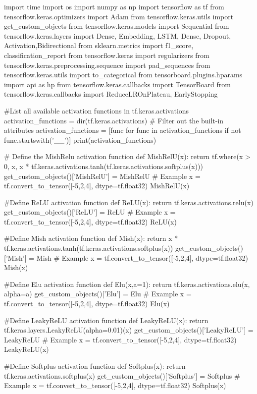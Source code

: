 import time
import os
import numpy as np
import tensorflow as tf
from tensorflow.keras.optimizers import Adam
from tensorflow.keras.utils import get_custom_objects
from tensorflow.keras.models import Sequential
from tensorflow.keras.layers import Dense, Embedding, LSTM, Dense, Dropout, Activation,Bidirectional 
from sklearn.metrics import f1_score, classification_report
from tensorflow.keras import regularizers
from tensorflow.keras.preprocessing.sequence import pad_sequences
from tensorflow.keras.utils import to_categorical
from tensorboard.plugins.hparams import api as hp
from tensorflow.keras.callbacks import TensorBoard
from tensorflow.keras.callbacks import ReduceLROnPlateau, EarlyStopping

#List all available activation functions in tf.keras.activations
activation_functions = dir(tf.keras.activations)
# Filter out the built-in attributes
activation_functions = [func for func in activation_functions if not func.startswith('__')]
print(activation_functions)

# Define the MishRelu activation function
def MishRelU(x):
    return tf.where(x > 0, x, x * tf.keras.activations.tanh(tf.keras.activations.softplus(x)))
get_custom_objects()['MishRelU'] = MishRelU
# Example
x = tf.convert_to_tensor([-5,2,4], dtype=tf.float32)
MishRelU(x)

#Define ReLU activation function
def ReLU(x):
    return tf.keras.activations.relu(x)
get_custom_objects()['ReLU'] = ReLU
# Example
x = tf.convert_to_tensor([-5,2,4], dtype=tf.float32)
ReLU(x)

#Define Mish activation function
def Mish(x):
    return x * tf.keras.activations.tanh(tf.keras.activations.softplus(x))
get_custom_objects()['Mish'] = Mish
# Example
x = tf.convert_to_tensor([-5,2,4], dtype=tf.float32)
Mish(x)

#Define Elu activation function
def Elu(x,a=1):
    return  tf.keras.activations.elu(x, alpha=a)    
get_custom_objects()['Elu'] = Elu
# Example
x = tf.convert_to_tensor([-5,2,4], dtype=tf.float32)
Elu(x)

#Define LeakyReLU activation function
def LeakyReLU(x):
    return tf.keras.layers.LeakyReLU(alpha=0.01)(x)
get_custom_objects()['LeakyReLU'] = LeakyReLU
# Example
x = tf.convert_to_tensor([-5,2,4], dtype=tf.float32)
LeakyReLU(x)

#Define Softplus activation function
def Softplus(x):
    return tf.keras.activations.softplus(x)
get_custom_objects()['Softplus'] = Softplus
# Example
x = tf.convert_to_tensor([-5,2,4], dtype=tf.float32)
Softplus(x)

